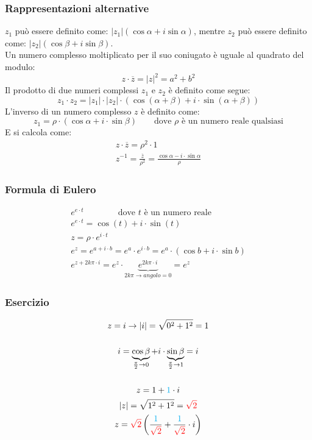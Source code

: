 \documentclass[italian]{article}
\begin{document}
\subsubsection{Rappresentazioni alternative}
$z_1$ può essere definito come: $|z_1|(\cos \alpha + i\sin \alpha)$, 
mentre $z_2$ può essere definito come: $|z_2|(\cos \beta + i\sin \beta)$.\\
Un numero complesso moltiplicato per il suo coniugato è uguale al quadrato del modulo:
\[
	z\cdot \overline{z} = |z|^2 = a^2 + b^2
\]
Il prodotto di due numeri complessi $z_1$ e $z_2$ è definito come segue:
\[
	z_1 \cdot z_2 = |z_1|\cdot |z_2|\cdot (\cos (\alpha + \beta) + i\cdot \sin (\alpha + \beta))
\]
L'inverso di un numero complesso $z$ è definito come:
\[
	z_1 = \rho \cdot (\cos \alpha + i\cdot \sin \beta) \qquad \text{dove $\rho$ è un numero reale qualsiasi}
\]
E si calcola come:
\begin{gather*}
	z\cdot \overline{z} = \rho ^2 \cdot 1 \\
	z^{-1} = \frac{\overline{z}}{\rho ^2}=\frac{\cos \alpha - i\cdot \sin \alpha}{\rho}
\end{gather*}

\subsubsection{Formula di Eulero}
\begin{gather*}
	e^{e\cdot t} \qquad \qquad \text{dove $t$ è un numero reale} \\
	e^{e\cdot t} = \cos (t) + i\cdot \sin (t) \\
	z=\rho \cdot e^{i\cdot t} \\
	e^z = e^{a+i\cdot b}=e^a\cdot e^{i\cdot b} = e^a\cdot (\cos b + i\cdot \sin b) \\
	e^{z+2k\pi \cdot i}=e^z\cdot \underbrace{e^{2k\pi \cdot i}}_{2k\pi \to angolo = 0} = e^z
\end{gather*}
\subsubsection{Esercizio}
\begin{gather*}
	z=i \to |i| = \sqrt{0^2 + 1^2} = 1\\\\ 
	i= \underbrace{\cos \beta}_{\frac{\pi}{2} \to 0} + i\cdot  \underbrace{\sin \beta}_{\frac{\pi}{2} \to 1} = i \\\\
	z=1+\textcolor{cyan}{1}\cdot i\\
	|z| = \sqrt{1^2+1^2}=\textcolor{red}{\sqrt{2}}\\
	z=\textcolor{red}{\sqrt{2}} \left( \frac{\textcolor{cyan}{1}}{\textcolor{red}{\sqrt{2}}}+\frac{\textcolor{cyan}{1}}{\textcolor{red}{\sqrt{2}}}\cdot i \right) 
\end{gather*}
\end{document}

